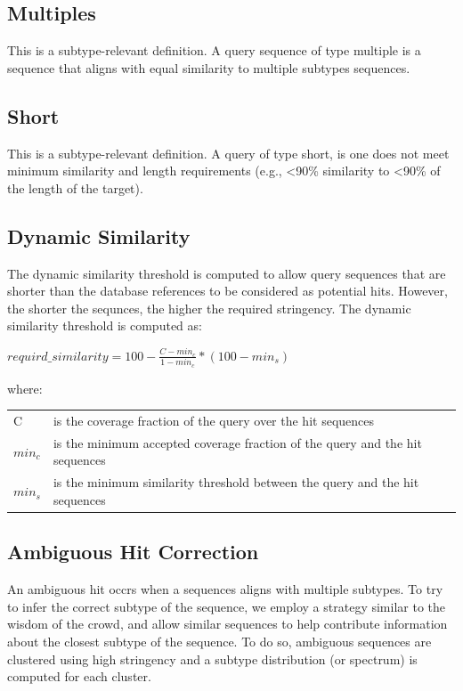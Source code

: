 \documentclass[letterpaper,10pt,english]{sphinxmanual}
\begin{document}
\subsection{Multiples}
\label{defs:id6}\label{defs:multiples}
This is a subtype-relevant definition. A query sequence of type multiple is a sequence that aligns with equal similarity to multiple subtypes  sequences.


\subsection{Short}
\label{defs:id7}\label{defs:short}
This is a subtype-relevant definition. A query of type short, is one does not meet minimum similarity and length requirements (e.g., \textless{}90\% similarity to \textless{}90\% of the length of the target).


\subsection{Dynamic Similarity}
\label{defs:dynamic-similarity}\label{defs:id8}
The dynamic similarity threshold is computed to allow query sequences
that are shorter than the database references to be considered as potential
hits. However, the shorter the sequnces, the higher the required stringency.
The dynamic similarity threshold is computed as:

\(requird\_similarity = 100 - \frac{C - min_c}{1-min_c} * (100 - min_s)\)

where:

\begin{tabulary}{\linewidth}{|L|L|}
\hline

C
 & 
is the coverage fraction of the query over the hit sequences
\\

\(min_c\)
 & 
is the minimum accepted coverage fraction of the query and the hit sequences
\\

\(min_s\)
 & 
is the minimum similarity threshold between the query and the hit sequences
\\
\hline\end{tabulary}



\subsection{Ambiguous Hit Correction}
\label{defs:multiple-hits}\label{defs:ambiguous-hit-correction}
An ambiguous hit occrs when a sequences aligns with multiple subtypes. To try to infer the correct subtype of
the sequence, we employ a strategy similar to the wisdom of the crowd, and allow similar sequences to help contribute
information about the closest subtype of the sequence. To do so, ambiguous sequences are clustered using high stringency
and a subtype distribution (or spectrum) is computed for each cluster.
\end{document}
